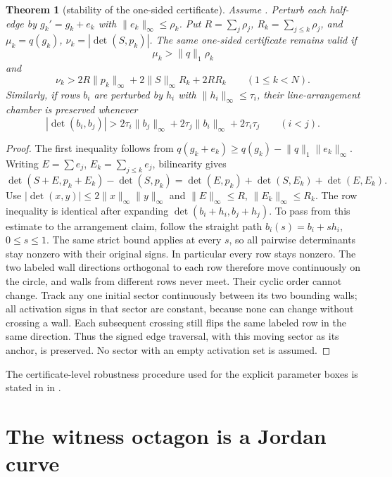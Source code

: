 \documentclass[11pt,twoside,leqno]{article}
\theoremstyle{plain}
\newtheorem{theorem}{Theorem}[section]
\theoremstyle{definition}
\theoremstyle{remark}
\newcommand{\norm}[1]{\lVert #1 \rVert}
\begin{document}
\begin{theorem}[stability of the one-sided certificate]\label{thm:stability}
Assume .  Perturb each half-edge by $g_k'=g_k+e_k$ with $\norm{e_k}_\infty\le\rho_k$.  Put $R=\sum_j\rho_j$, $R_k=\sum_{j\le k}\rho_j$, and $\mu_k=q(g_k)$, $\nu_k=|\det(S,p_k)|$.  The same one-sided certificate remains valid if
\[
 \mu_k>\norm{q}_1\rho_k
\]
and
\[
 \nu_k>
 2R\norm{p_k}_\infty+2\norm{S}_\infty R_k+2RR_k
 \qquad(1\le k<N).
\]
Similarly, if rows $b_i$ are perturbed by $h_i$ with $\norm{h_i}_\infty\le\tau_i$, their line-arrangement chamber is preserved whenever
\[
 |\det(b_i,b_j)|>
 2\tau_i\norm{b_j}_\infty+2\tau_j\norm{b_i}_\infty+2\tau_i\tau_j
 \qquad(i<j).
\]
\end{theorem}

\begin{proof}
The first inequality follows from $q(g_k+e_k)\ge q(g_k)-\norm q_1\norm{e_k}_\infty$. Writing $E=\sum e_j$, $E_k=\sum_{j\le k}e_j$, bilinearity gives
\[
 \det(S+E,p_k+E_k)-\det(S,p_k)
 =\det(E,p_k)+\det(S,E_k)+\det(E,E_k).
\]
Use $|\det(x,y)|\le2\norm{x}_\infty\norm{y}_\infty$ and $\norm E_\infty\le R$, $\norm{E_k}_\infty\le R_k$. The row inequality is identical after expanding $\det(b_i+h_i,b_j+h_j)$.
To pass from this estimate to the arrangement claim, follow the straight path
$b_i(s)=b_i+s h_i$, $0\le s\le1$. The same strict bound applies at every $s$,
so all pairwise determinants stay nonzero with their original signs. In
particular every row stays nonzero. The two labeled wall directions
orthogonal to each row therefore move continuously on the circle, and walls
from different rows never meet. Their cyclic order cannot change. Track any
one initial sector continuously between its two bounding walls; all activation
signs in that sector are constant, because none can change without crossing a
wall. Each subsequent crossing still flips the same labeled row in the same
direction. Thus the signed edge traversal, with this moving sector as its
anchor, is preserved. No sector with an empty activation set is assumed.
\end{proof}
The certificate-level robustness procedure used for the explicit parameter boxes is stated in  in .

\section{The witness octagon is a Jordan curve}\label{sec:cert}
\end{document}

